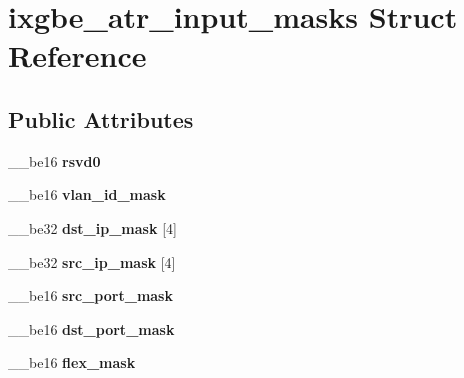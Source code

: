 \hypertarget{structixgbe__atr__input__masks}{
\section{ixgbe\_\-atr\_\-input\_\-masks Struct Reference}
\label{structixgbe__atr__input__masks}
}
\subsection*{Public Attributes}
\begin{DoxyCompactItemize}
\item 
\hypertarget{structixgbe__atr__input__masks_a53bd655e10242741c4f68a11e598333a}{
\_\-\_\-be16 {\bfseries rsvd0}}
\label{structixgbe__atr__input__masks_a53bd655e10242741c4f68a11e598333a}

\item 
\hypertarget{structixgbe__atr__input__masks_a7340f96a59bb7071ce1f53a892db0a85}{
\_\-\_\-be16 {\bfseries vlan\_\-id\_\-mask}}
\label{structixgbe__atr__input__masks_a7340f96a59bb7071ce1f53a892db0a85}

\item 
\hypertarget{structixgbe__atr__input__masks_a5b017ea15a22336eadbfa49588ecd123}{
\_\-\_\-be32 {\bfseries dst\_\-ip\_\-mask} \mbox{[}4\mbox{]}}
\label{structixgbe__atr__input__masks_a5b017ea15a22336eadbfa49588ecd123}

\item 
\hypertarget{structixgbe__atr__input__masks_aeef2cdbef68c47d2aa773aa2d0f15146}{
\_\-\_\-be32 {\bfseries src\_\-ip\_\-mask} \mbox{[}4\mbox{]}}
\label{structixgbe__atr__input__masks_aeef2cdbef68c47d2aa773aa2d0f15146}

\item 
\hypertarget{structixgbe__atr__input__masks_a861799b45641612eb4070fedb97cabba}{
\_\-\_\-be16 {\bfseries src\_\-port\_\-mask}}
\label{structixgbe__atr__input__masks_a861799b45641612eb4070fedb97cabba}

\item 
\hypertarget{structixgbe__atr__input__masks_a9166c12e7352394cad0c69a0948f2559}{
\_\-\_\-be16 {\bfseries dst\_\-port\_\-mask}}
\label{structixgbe__atr__input__masks_a9166c12e7352394cad0c69a0948f2559}

\item 
\hypertarget{structixgbe__atr__input__masks_a5defde7c514368eb37e8b01d31b0fe64}{
\_\-\_\-be16 {\bfseries flex\_\-mask}}
\label{structixgbe__atr__input__masks_a5defde7c514368eb37e8b01d31b0fe64}

\end{DoxyCompactItemize}


